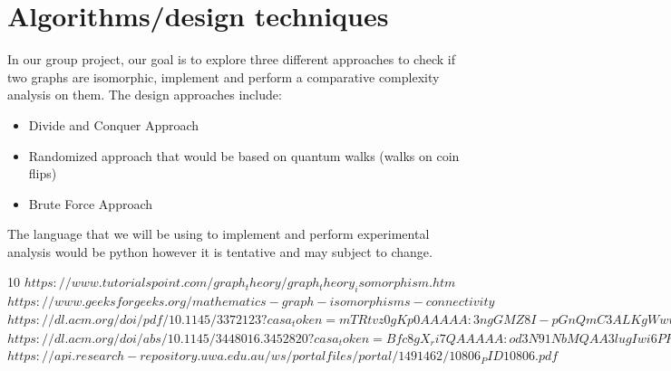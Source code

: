 \documentclass[a4paper]{article}
\begin{document}
\section{Algorithms/design techniques}
In our group project, our goal is to explore three different approaches to check if two graphs are isomorphic, implement and perform a comparative complexity analysis on them. The design approaches include:\\
\begin{itemize}
\item Divide and Conquer Approach\\
\item Randomized approach that would be based on quantum walks (walks on coin flips)\\
\item Brute Force Approach \\
\end{itemize}
The language that we will be using to implement and perform experimental analysis would be python however it is tentative and may subject to change. 
\begin{thebibliography}{10} %
\addtolength{\leftmargin}{0.2in} %
\setlength{\itemindent}{-0.2in}
$https://www.tutorialspoint.com/graph_theory/graph_theory_isomorphism.htm$
\\
$https://www.geeksforgeeks.org/mathematics-graph-isomorphisms-connectivity$
\\
$https://dl.acm.org/doi/pdf/10.1145/3372123?casa_token=mTRtvz0gKp0AAAAA:3ngGMZ8I-pGnQmC3ALKgWwuc2cO_5wj_rk6wJEi21qwEpBqDwK14SvcGypOPFMlp2Qw2JrlfJY69jw$
\\
$https://dl.acm.org/doi/abs/10.1145/3448016.3452820?casa_token=Bfc8gX_ri7QAAAAA:od3N91NbMQAA3lugIwi6PKa_BgV-gH9GArJUm4ZFPzwBi6s-JE_PeDTCN6m07ufUcPS5YLIpLHqwcg$
\\
$https://api.research-repository.uwa.edu.au/ws/portalfiles/portal/1491462/10806_PID10806.pdf$

\end{thebibliography}
\end{document}
